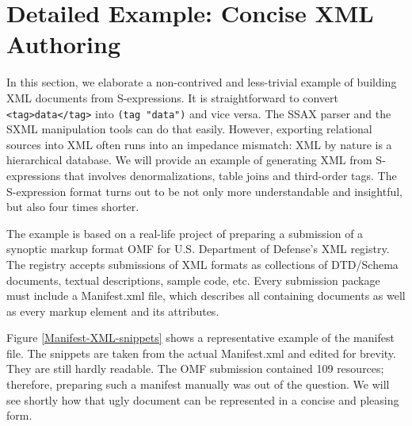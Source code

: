 \documentclass[10pt]{llncs}
\begin{document}
\section{Detailed Example: Concise XML Authoring}
In this section, we elaborate a non-contrived and less-trivial
example of building XML documents from S-expressions.  It is
straightforward to convert \texttt{<tag>data</tag>} into \texttt{(tag "data")} and vice versa. The SSAX parser and the SXML
manipulation tools can do that easily. However, exporting relational
sources into XML often runs into an impedance mismatch: XML by nature
is a hierarchical database. We will provide an example of generating
XML from S-expressions that involves denormalizations, table joins and
third-order tags. The S-expression format turns out to be not only
more understandable and insightful, but also four times shorter.

The example is based on a real-life project of preparing a
submission of a synoptic markup format OMF \cite{OMF} for
U.S. Department of Defense's XML registry. The registry \cite{XML-DoDReg} accepts submissions of XML formats as collections of
DTD/Schema documents, textual descriptions, sample code, etc. Every
submission package must include a Manifest.xml file, which describes
all containing documents as well as every markup element and its
attributes.

Figure \ref{Manifest-XML-snippets} shows a representative
example of the manifest file. The snippets are taken from the actual
Manifest.xml \cite{Manifest-XML} and edited for brevity. They are
still hardly readable. The OMF submission contained 109
resources; therefore, preparing such a manifest manually was out of
the question. We will see shortly how that ugly document can be
represented in a concise and pleasing form.
\end{document}
